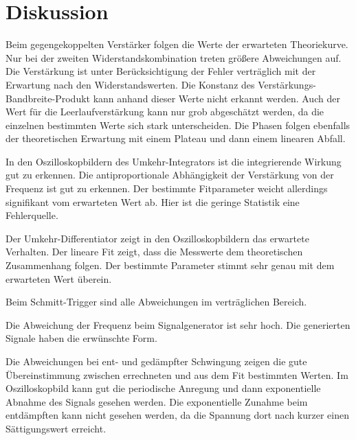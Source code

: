 \section{Diskussion}
\label{sec:Diskussion}

Beim gegengekoppelten Verstärker folgen die Werte der erwarteten Theoriekurve. Nur bei der zweiten Widerstandskombination treten größere Abweichungen auf. Die Verstärkung ist unter Berücksichtigung der Fehler verträglich mit der Erwartung nach den Widerstandswerten. Die Konstanz des Verstärkungs-Bandbreite-Produkt kann anhand dieser Werte nicht erkannt werden. Auch der Wert für die Leerlaufverstärkung kann nur grob abgeschätzt werden, da die einzelnen bestimmten Werte sich stark unterscheiden. Die Phasen folgen ebenfalls der theoretischen Erwartung mit einem Plateau und dann einem linearen Abfall.

In den Oszilloskopbildern des Umkehr-Integrators ist die integrierende Wirkung gut zu erkennen. Die antiproportionale Abhängigkeit der Verstärkung von der Frequenz ist gut zu erkennen. Der bestimmte Fitparameter weicht allerdings signifikant vom erwarteten Wert ab. Hier ist die geringe Statistik eine Fehlerquelle.

Der Umkehr-Differentiator zeigt in den Oszilloskopbildern das erwartete Verhalten. Der lineare Fit zeigt, dass die Messwerte dem theoretischen Zusammenhang folgen. Der bestimmte Parameter stimmt sehr genau mit dem erwarteten Wert überein.

Beim Schmitt-Trigger sind alle Abweichungen im verträglichen Bereich.

Die Abweichung der Frequenz beim Signalgenerator ist sehr hoch. Die generierten Signale haben die erwünschte Form.

Die Abweichungen bei ent- und gedämpfter Schwingung zeigen die gute Übereinstimmung zwischen errechneten und aus dem Fit bestimmten Werten. Im Oszilloskopbild kann gut die periodische Anregung und dann exponentielle Abnahme des Signals gesehen werden. Die exponentielle Zunahme beim entdämpften kann nicht gesehen werden, da die Spannung dort nach kurzer einen Sättigungswert erreicht.
